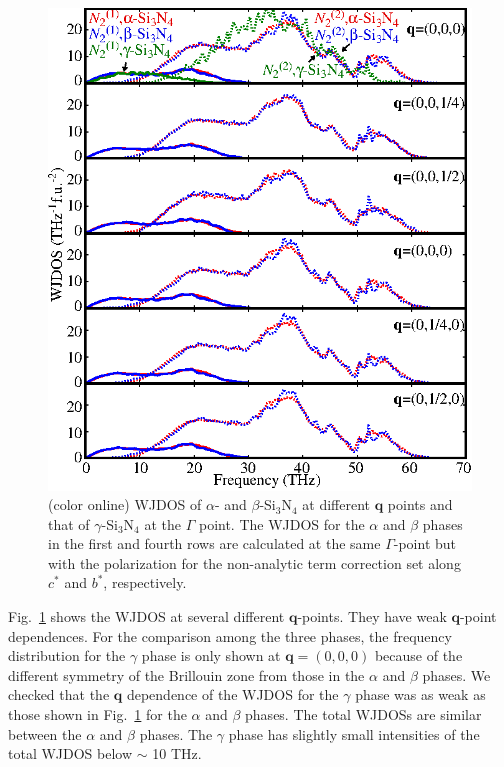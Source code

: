 \documentclass[twocolumn,amsmath,amssymb,a4paper,prb,superscriptaddress,floatfix]{revtex4-1}
\begin{document}
\begin{figure}[ht]
 \centering
  \includegraphics[width=0.9\linewidth]{figure_wjdoss.eps} \caption{(color
	  online) WJDOS of $\alpha$- and $\beta$-Si$_3$N$_4$ at different $\mathbf
	  q$ points and that of $\gamma$-Si$_3$N$_4$ at the $\Gamma$ point. 
  The WJDOS for the $\alpha$ and $\beta$ phases in the  first and fourth rows
  are calculated at the same $\Gamma$-point but 
  with the polarization for the non-analytic term correction set along $c^*$ and
  $b^*$, respectively. \label{fig:Fig6_338} }
 \centering
\end{figure}

Fig.~\ref{fig:Fig6_338} shows the WJDOS at several different
$\mathbf{q}$-points. They have weak $\mathbf{q}$-point dependences.  For the
comparison among the three phases, the frequency distribution for the $\gamma$
phase is only shown at $\mathbf{q}=(0,0,0)$ because of the different symmetry
of the Brillouin zone from those in the $\alpha$ and $\beta$ phases. We checked
that the $\mathbf{q}$ dependence of the WJDOS for the $\gamma$ phase was as
weak as those shown in Fig.~\ref{fig:Fig6_338} for the $\alpha$ and $\beta$
phases. 
The total WJDOSs are similar between the $\alpha$ and $\beta$ phases.
The $\gamma$ phase has slightly small intensities of the total WJDOS below
$\sim$ 10 THz.
\end{document}
